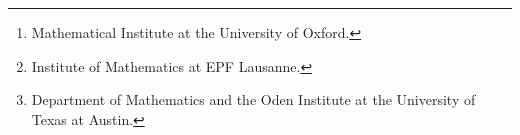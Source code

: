 \author{Nathaniel Pritchard\thanks{Mathematical Institute at the University of Oxford.}
\and Taejun Park\thanks{Institute of Mathematics at EPF Lausanne.}
\and Yuji Nakatsukasa\footnotemark[2]
\and Per-Gunnar Martinsson\thanks{Department of Mathematics and the Oden Institute at the University of Texas at Austin.} 
}

\usepackage{amsopn}
\DeclareMathOperator{\diag}{diag}

\makeatletter
\newcommand*{\addFileDependency}[1]{%
  \typeout{(#1)}%
  \@addtofilelist{#1}%
  \IfFileExists{#1}{}{\typeout{No file #1.}}%
}
\makeatother

\newcommand*{\myexternaldocument}[1]{%
    \addFileDependency{#1.tex}%
    \addFileDependency{#1.aux}%
}
